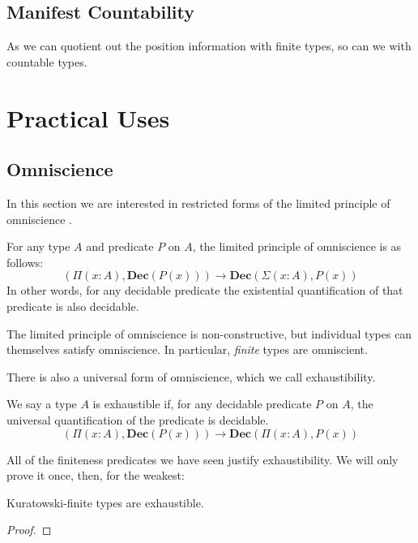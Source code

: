 \subsection{Manifest Countability}
As we can quotient out the position information with finite types, so can we with
countable types.
\section{Practical Uses} \label{practical}
\subsection{Omniscience}
In this section we are interested in restricted forms of the limited principle
of omniscience \cite{myhillErrettBishopFoundations1972}.
\begin{rm-definition}
  For any type \(A\) and predicate \(P\) on \(A\), the limited principle of
  omniscience is as follows:
  \begin{equation}
    \left( \Pi {(x : A)} , \mathbf{Dec}(P(x)) \right) \rightarrow \mathbf{Dec} \left( \Sigma {(x : A)} , P(x) \right)
  \end{equation}
  In other words, for any decidable predicate the existential quantification of
  that predicate is also decidable.
\end{rm-definition}
The limited principle of omniscience is non-constructive, but individual types
can themselves satisfy omniscience.
In particular, \emph{finite} types are omniscient.

There is also a universal form of omniscience, which we call exhaustibility.
\begin{rm-definition}[Exhaustibility]
  We say a type \(A\) is exhaustible if, for any decidable predicate \(P\) on
  \(A\), the universal quantification of the predicate is decidable.
  \begin{equation}
    \left( \Pi {(x : A)} , \mathbf{Dec}(P(x)) \right) \rightarrow \mathbf{Dec} \left( \Pi {(x : A)} , P(x) \right)
  \end{equation}
\end{rm-definition}

All of the finiteness predicates we have seen justify exhaustibility.
We will only prove it once, then, for the weakest:
\begin{rm-theorem}
  Kuratowski-finite types are exhaustible.
\end{rm-theorem}
\begin{proof}
\end{proof}

